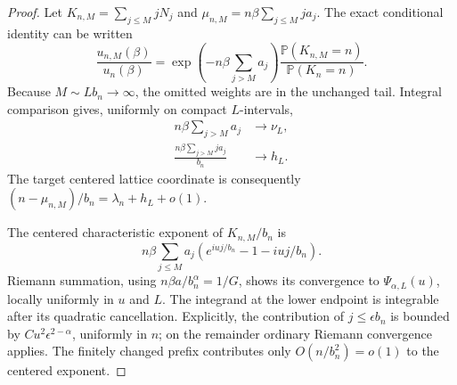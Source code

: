 \documentclass[11pt,a4paper]{article}
\numberwithin{equation}{section}
\theoremstyle{definition}
\theoremstyle{remark}
\newcommand{\Prob}{\mathbb P}
\begin{document}
\begin{proof}
Let $K_{n,M}=\sum_{j\le M}jN_j$ and
$\mu_{n,M}=n\beta\sum_{j\le M}j a_j$. The exact conditional identity
can be written
\begin{equation}\label{eq:cutoff-ratio-exact}
 \frac{u_{n,M}(\beta)}{u_n(\beta)}
 =\exp\left(-n\beta\sum_{j>M}a_j\right)
       \frac{\Prob(K_{n,M}=n)}{\Prob(K_n=n)}.
\end{equation}
Because $M\sim Lb_n\to\infty$, the omitted weights are in the unchanged
tail. Integral comparison gives, uniformly on compact $L$-intervals,
\begin{align}
 n\beta\sum_{j>M}a_j&\longrightarrow\nu_L,\label{eq:cutoff-mass}\\
 \frac{n\beta\sum_{j>M}j a_j}{b_n}&\longrightarrow h_L.
       \label{eq:cutoff-mean}
\end{align}
The target centered lattice coordinate is consequently
$(n-\mu_{n,M})/b_n=\lambda_n+h_L+o(1)$.

The centered characteristic exponent of $K_{n,M}/b_n$ is
\[
 n\beta\sum_{j\le M}a_j
        (e^{iu j/b_n}-1-iu j/b_n).
\]
Riemann summation, using $n\beta a/b_n^\alpha=1/G$, shows its convergence
to $\Psi_{\alpha,L}(u)$, locally uniformly in $u$ and $L$.
The integrand at the lower endpoint is integrable after its quadratic
cancellation. Explicitly, the contribution of $j\le\epsilon b_n$ is
bounded by $C u^2\epsilon^{2-\alpha}$, uniformly in $n$; on the remainder
ordinary Riemann convergence applies. The finitely changed prefix
contributes only $O(n/b_n^2)=o(1)$ to the centered exponent.


\end{proof}
\end{document}
